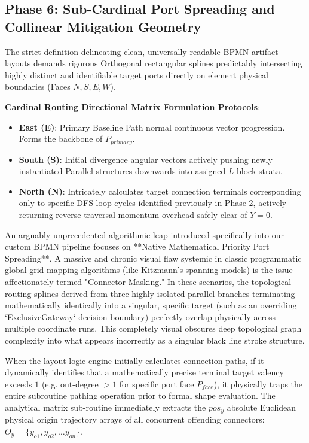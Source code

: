 \documentclass[fleqn,10pt]{wlscirep}
\begin{document}
\subsection*{Phase 6: Sub-Cardinal Port Spreading and Collinear Mitigation Geometry}
The strict definition delineating clean, universally readable BPMN artifact layouts demands rigorous Orthogonal rectangular splines predictably intersecting highly distinct and identifiable target ports directly on element physical boundaries (Faces $N, S, E, W$). 

\textbf{Cardinal Routing Directional Matrix Formulation Protocols}:
\begin{itemize}
    \item \textbf{East (E)}: Primary Baseline Path normal continuous vector progression. Forms the backbone of $P_{primary}$.
    \item \textbf{South (S)}: Initial divergence angular vectors actively pushing newly instantiated Parallel structures downwards into assigned $L$ block strata.
    \item \textbf{North (N)}: Intricately calculates target connection terminals corresponding only to specific DFS loop cycles identified previously in Phase 2, actively returning reverse traversal momentum overhead safely clear of $Y=0$.
\end{itemize}

An arguably unprecedented algorithmic leap introduced specifically into our custom BPMN pipeline focuses on **Native Mathematical Priority Port Spreading**. A massive and chronic visual flaw systemic in classic programmatic global grid mapping algorithms (like Kitzmann's spanning models) is the issue affectionately termed "Connector Masking." In these scenarios, the topological routing splines derived from three highly isolated parallel branches terminating mathematically identically into a singular, specific target (such as an overriding `ExclusiveGateway` decision boundary) perfectly overlap physically across multiple coordinate runs. This completely visual obscures deep topological graph complexity into what appears incorrectly as a singular black line stroke structure.

When the layout logic engine initially calculates connection paths, if it dynamically identifies that a mathematically precise terminal target valency exceeds $1$ (e.g. out-degree $>1$ for specific port face $P_{face}$), it physically traps the entire subroutine pathing operation prior to formal shape evaluation. The analytical matrix sub-routine immediately extracts the $pos_y$ absolute Euclidean physical origin trajectory arrays of all concurrent offending connectors: $O_y = \{y_{o1}, y_{o2}, \dots y_{on}\}$. 
\end{document}
